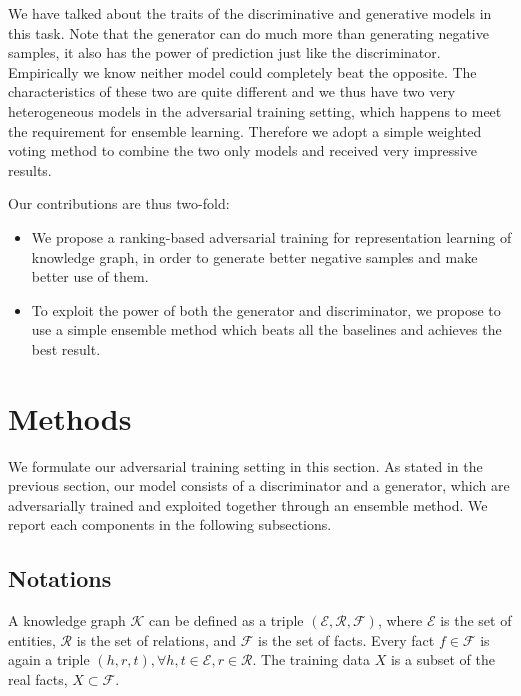 \documentclass[twocolumn,a4paper,preprint,10pt,3p]{elsarticle}
\begin{document}
We have talked about the traits of the discriminative and generative models in this task. Note that the generator can do much more than generating negative samples, it also has the power of prediction just like the discriminator. Empirically we know neither model could completely beat the opposite. The characteristics of these two are quite different and we thus have two very heterogeneous models in the adversarial training setting, which happens to meet the requirement for ensemble learning. Therefore we adopt a simple weighted voting method to combine the two only models and received very impressive results.

Our contributions are thus two-fold:
\begin{itemize}
    \item We propose a ranking-based adversarial training for representation learning of knowledge graph, in order to generate better negative samples and make better use of them.
    \item To exploit the power of both the generator and discriminator, we propose to use a simple ensemble method which beats all the baselines and achieves the best result.
\end{itemize}





\section{Methods}

We formulate our adversarial training setting in this section. As stated in the previous section, our model consists of a discriminator and a generator, which are adversarially trained and exploited together through an ensemble method. We report each components in the following subsections.

\subsection{Notations}

A knowledge graph $\mathcal{K}$ can be defined as a triple $(\mathcal{E}, \mathcal{R}, \mathcal{F})$, where $\mathcal{E}$ is the set of entities, $\mathcal{R}$ is the set of relations, and $\mathcal{F}$ is the set of facts. Every fact $f\in \mathcal{F}$ is again a triple $(h, r, t), \forall h,t\in\mathcal{E}, r\in\mathcal{R}$. The training data $X$ is a subset of the real facts, $X \subset \mathcal{F}$.
\end{document}
